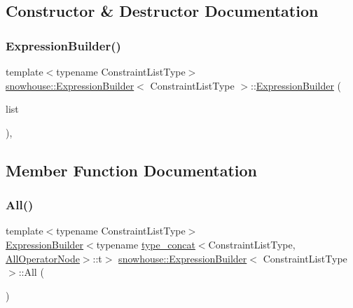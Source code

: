 \subsection{Constructor \& Destructor Documentation}
\mbox{\label{structsnowhouse_1_1ExpressionBuilder_a6213781ea7eb8ddcfef7dd202041354d}} 
\subsubsection{\texorpdfstring{ExpressionBuilder()}{ExpressionBuilder()}}
{\footnotesize\ttfamily template$<$typename Constraint\+List\+Type$>$ \\
\mbox{\hyperlink{structsnowhouse_1_1ExpressionBuilder}{snowhouse\+::\+Expression\+Builder}}$<$ Constraint\+List\+Type $>$\+::\mbox{\hyperlink{structsnowhouse_1_1ExpressionBuilder}{Expression\+Builder}} (\begin{DoxyParamCaption}\item[{const Constraint\+List\+Type \&}]{list }\end{DoxyParamCaption})\hspace{0.3cm}{\ttfamily [inline]}, {\ttfamily [explicit]}}



\subsection{Member Function Documentation}
\mbox{\label{structsnowhouse_1_1ExpressionBuilder_a553914f0120a29b8e5edc98d83490e46}} 
\subsubsection{\texorpdfstring{All()}{All()}}
{\footnotesize\ttfamily template$<$typename Constraint\+List\+Type$>$ \\
\mbox{\hyperlink{structsnowhouse_1_1ExpressionBuilder}{Expression\+Builder}}$<$typename \mbox{\hyperlink{structsnowhouse_1_1type__concat}{type\+\_\+concat}}$<$Constraint\+List\+Type, \mbox{\hyperlink{structsnowhouse_1_1ExpressionBuilder_a25ac097d527e6c4fabd98aa1334a42c6}{All\+Operator\+Node}}$>$\+::t$>$ \mbox{\hyperlink{structsnowhouse_1_1ExpressionBuilder}{snowhouse\+::\+Expression\+Builder}}$<$ Constraint\+List\+Type $>$\+::All (\begin{DoxyParamCaption}{ }\end{DoxyParamCaption})\hspace{0.3cm}{\ttfamily [inline]}}

